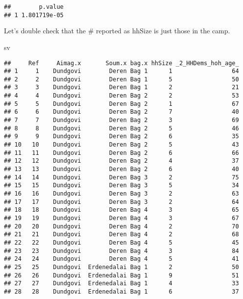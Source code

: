 \documentclass[
]{article}
\newenvironment{Shaded}{\begin{snugshade}}{\end{snugshade}}
\newcommand{\NormalTok}[1]{#1}
\begin{document}
\begin{verbatim}
##        p.value
## 1 1.801719e-05
\end{verbatim}

Let's double check that the \# reported as hhSize is just those in the
camp.

\begin{Shaded}
\begin{Highlighting}[]
\NormalTok{sv}
\end{Highlighting}
\end{Shaded}

\begin{verbatim}
##     Ref     Aimag.x       Soum.x bag.x hhSize _2_HHDems_hoh_age_
## 1     1    Dundgovi        Deren Bag 1      1                 64
## 2     2    Dundgovi        Deren Bag 1      5                 50
## 3     3    Dundgovi        Deren Bag 1      2                 21
## 4     4    Dundgovi        Deren Bag 2      2                 53
## 5     5    Dundgovi        Deren Bag 2      1                 67
## 6     6    Dundgovi        Deren Bag 2      7                 40
## 7     7    Dundgovi        Deren Bag 2      3                 69
## 8     8    Dundgovi        Deren Bag 2      5                 46
## 9     9    Dundgovi        Deren Bag 2      6                 35
## 10   10    Dundgovi        Deren Bag 2      5                 43
## 11   11    Dundgovi        Deren Bag 2      6                 66
## 12   12    Dundgovi        Deren Bag 2      4                 37
## 13   13    Dundgovi        Deren Bag 2      6                 40
## 14   14    Dundgovi        Deren Bag 3      2                 75
## 15   15    Dundgovi        Deren Bag 3      5                 34
## 16   16    Dundgovi        Deren Bag 3      2                 63
## 17   17    Dundgovi        Deren Bag 3      2                 64
## 18   18    Dundgovi        Deren Bag 4      3                 65
## 19   19    Dundgovi        Deren Bag 4      3                 67
## 20   20    Dundgovi        Deren Bag 4      2                 70
## 21   21    Dundgovi        Deren Bag 4      2                 68
## 22   22    Dundgovi        Deren Bag 4      5                 45
## 23   23    Dundgovi        Deren Bag 4      3                 84
## 24   24    Dundgovi        Deren Bag 4      5                 41
## 25   25    Dundgovi  Erdenedalai Bag 1      2                 50
## 26   26    Dundgovi  Erdenedalai Bag 1      9                 51
## 27   27    Dundgovi  Erdenedalai Bag 1      4                 33
## 28   28    Dundgovi  Erdenedalai Bag 1      6                 37

\end{verbatim}
\end{document}
